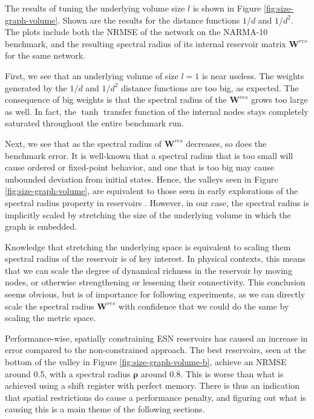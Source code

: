 The results of tuning the underlying volume size $l$ is shown in Figure
\ref{fig:size-graph-volume}. Shown are the results for the distance functions
$1/d$ and $1/d^2$. The plots include both the NRMSE of the network on the
NARMA-10 benchmark, and the resulting spectral radius of its internal reservoir
matrix $\mathbf{W}^{res}$ for the same network.

First, we see that an underlying volume of size $l = 1$ is near useless. The
weights generated by the $1/d$ and $1/d^2$ distance functions are too big, as
expected. The consequence of big weights is that the spectral radius of the
$\mathbf{W}^{res}$ grows too large as well. In fact, the $\tanh$ transfer
function of the internal nodes stays completely saturated throughout the entire
benchmark run.

Next, we see that as the spectral radius of $\mathbf{W}^{res}$ decreases, so
does the benchmark error. It is well-known that a spectral radius that is too
small will cause ordered or fixed-point behavior, and one that is too big may
cause unbounded deviation from initial states. Hence, the valleys seen in Figure
\ref{fig:size-graph-volume}, are equivalent to those seen in early explorations
of the spectral radius property in reservoirs
\cite{verstraeten_experimental_2007}. However, in our case, the spectral radius
is implicitly scaled by stretching the size of the underlying volume in which
the graph is embedded.

Knowledge that stretching the underlying space is equivalent to scaling them
spectral radius of the reservoir is of key interest. In physical contexts, this
means that we can scale the degree of dynamical richness in the reservoir by
moving nodes, or otherwise strengthening or lessening their connectivity. This
conclusion seems obvious, but is of importance for following experiments, as we
can directly scale the spectral radius $\mathbf{W}^{res}$ with confidence that
we could do the same by scaling the metric space.

Performance-wise, spatially constraining ESN reservoirs has caused an increase
in error compared to the non-constrained approach. The best reservoirs, seen at
the bottom of the valley in Figure \ref{fig:size-graph-volume-b}, achieve an
NRMSE around 0.5, with a spectral radius $\boldsymbol{\rho}$ around 0.8. This is
worse than what is achieved using a shift register with perfect memory. There is
thus an indication that spatial restrictions do cause a performance penalty, and
figuring out what is causing this is a main theme of the following sections.

